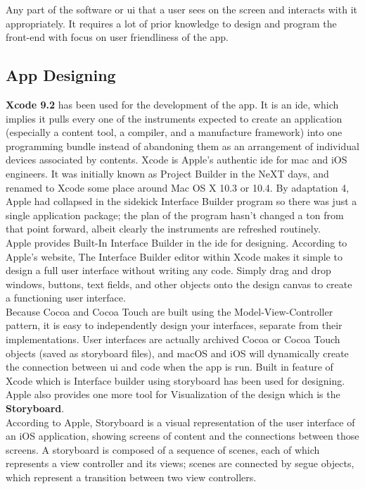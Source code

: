 Any part of the software or \gls{ui} that a user sees on the screen and interacts with it appropriately. It requires a lot of prior knowledge to design and program the front-end with focus on user friendliness of the app.

\subsection{App Designing}

\textbf{Xcode 9.2} has been used for the development of the app. It is an \gls{ide}, which implies it pulls every one of the instruments expected to create an application (especially a content tool, a compiler, and a manufacture framework) into one programming bundle instead of abandoning them as an arrangement of individual devices associated by contents. Xcode is Apple's authentic \gls{ide} for \gls{mac} and \gls{iOS} engineers. It was initially known as Project Builder in the NeXT days, and renamed to Xcode some place around Mac OS X 10.3 or 10.4. By adaptation 4, Apple had collapsed in the sidekick Interface Builder program so there was just a single application package; the plan of the program hasn't changed a ton from that point forward, albeit clearly the instruments are refreshed routinely. \\
Apple provides Built-In Interface Builder in the \gls{ide} for designing.
According to Apple's website, The Interface Builder editor within Xcode makes it simple to design a full user interface without writing any code. Simply drag and drop windows, buttons, text fields, and other objects onto the design canvas to create a functioning user interface. \cite{Xcode} \\
Because Cocoa and Cocoa Touch are built using the Model-View-Controller pattern, it is easy to independently design your interfaces, separate from their implementations. User interfaces are actually archived Cocoa or Cocoa Touch objects (saved as storyboard files), and \gls{macOS} and \gls{iOS} will dynamically create the connection between \gls{ui} and code when the app is run. Built in feature of Xcode which is Interface builder using storyboard has been used for designing. Apple also provides one more tool for Visualization of the design which is the \textbf{Storyboard}. \\
According to Apple, Storyboard is a visual representation of the user interface of an \gls{iOS} application, showing screens of content and the connections between those screens. A storyboard is composed of a sequence of scenes, each of which represents a view controller and its views; scenes are connected by segue objects, which represent a transition between two view controllers. \cite{Storyboard}  \\
